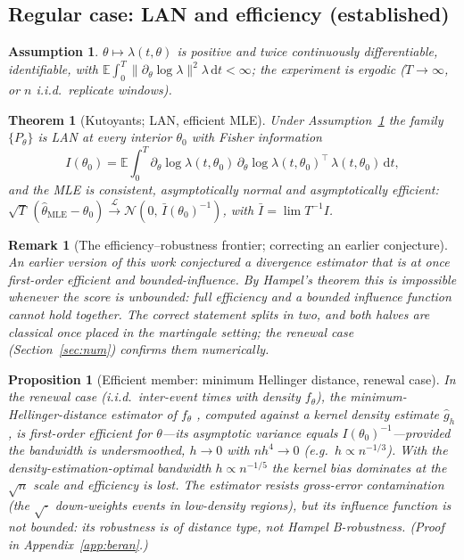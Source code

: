 \documentclass[11pt]{article}
\newtheorem{theorem}{Theorem}
\newtheorem{proposition}{Proposition}
\newtheorem{assumption}{Assumption}
\newtheorem{remark}{Remark}
\newcommand{\dd}{\,\mathrm{d}}
\newcommand{\E}{\mathbb{E}}
\newcommand{\toL}{\xrightarrow{\mathcal{L}}}
\begin{document}
\subsection{Regular case: LAN and efficiency (established)}
\begin{assumption}\label{a:reg}
$\theta\mapsto\lambda(t,\theta)$ is positive and twice continuously
differentiable, identifiable, with $\E\int_0^T\|\partial_\theta\log\lambda\|^2\lambda\dd t<\infty$;
the experiment is ergodic ($T\to\infty$, or $n$ i.i.d.\ replicate windows).
\end{assumption}
\begin{theorem}[Kutoyants; LAN, efficient MLE]\label{thm:lan}
Under Assumption~\ref{a:reg} the family $\{P_\theta\}$ is LAN at every interior
$\theta_0$ with Fisher information
\begin{equation}\label{eq:fisher}
I(\theta_0)=\E\int_0^T \partial_\theta\log\lambda(t,\theta_0)\,
\partial_\theta\log\lambda(t,\theta_0)^{\!\top}\,\lambda(t,\theta_0)\dd t ,
\end{equation}
and the MLE is consistent, asymptotically normal and asymptotically efficient:
$\sqrt{T}\,(\hat\theta_{\mathrm{MLE}}-\theta_0)\toL \mathcal N(0,\,\bar I(\theta_0)^{-1})$,
with $\bar I=\lim T^{-1}I$. \citep{kutoyants1998,kutoyants1984,ih1981}
\end{theorem}
\begin{remark}[The efficiency--robustness frontier; correcting an earlier conjecture]
\label{rem:hampel}
An earlier version of this work conjectured a divergence estimator that is at once
first-order efficient \emph{and} bounded-influence. By Hampel's theorem this is
impossible whenever the score is unbounded: full efficiency and a bounded influence
function cannot hold together. The correct statement splits in two, and both halves
are classical once placed in the martingale setting; the renewal case
(Section~\ref{sec:num}) confirms them numerically.
\end{remark}
\begin{proposition}[Efficient member: minimum Hellinger distance, renewal case]
\label{prop:beran}
In the renewal case (i.i.d.\ inter-event times with density $f_\theta$), the
minimum-Hellinger-distance estimator of $f_\theta$ \citep{beran1977}, computed against
a kernel density estimate $\hat g_h$, is first-order efficient for $\theta$---its
asymptotic variance equals $I(\theta_0)^{-1}$---\emph{provided the bandwidth is
undersmoothed}, $h\to0$ with $n h^4\to0$ (e.g.\ $h\propto n^{-1/3}$). With the
density-estimation-optimal bandwidth $h\propto n^{-1/5}$ the kernel bias dominates at
the $\sqrt n$ scale and efficiency is \emph{lost}. The estimator resists gross-error
contamination (the $\sqrt{\cdot}$ down-weights events in low-density regions), but its
influence function is \emph{not} bounded: its robustness is of distance type, not
Hampel B-robustness. (Proof in Appendix~\ref{app:beran}.)
\end{proposition}
\end{document}
